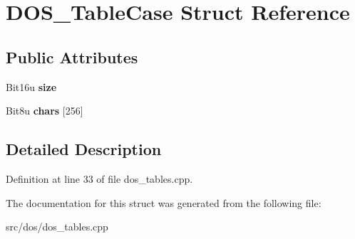 \hypertarget{structDOS__TableCase}{\section{D\-O\-S\-\_\-\-Table\-Case Struct Reference}
\label{structDOS__TableCase}
}
\subsection*{Public Attributes}
\begin{DoxyCompactItemize}
\item 
\hypertarget{structDOS__TableCase_aa37ae3c4e7b692b2d03feb6048acc20c}{Bit16u {\bfseries size}}\label{structDOS__TableCase_aa37ae3c4e7b692b2d03feb6048acc20c}

\item 
\hypertarget{structDOS__TableCase_ab2e496ce3c2d3bbdb820be16c0a4cd74}{Bit8u {\bfseries chars} \mbox{[}256\mbox{]}}\label{structDOS__TableCase_ab2e496ce3c2d3bbdb820be16c0a4cd74}

\end{DoxyCompactItemize}


\subsection{Detailed Description}


Definition at line 33 of file dos\-\_\-tables.\-cpp.



The documentation for this struct was generated from the following file\-:\begin{DoxyCompactItemize}
\item 
src/dos/dos\-\_\-tables.\-cpp\end{DoxyCompactItemize}

